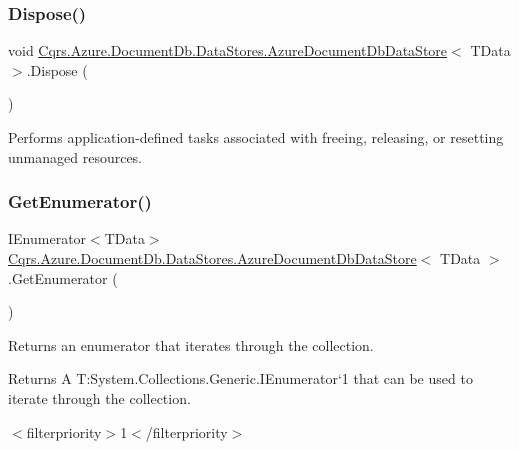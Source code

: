 \subsubsection{\texorpdfstring{Dispose()}{Dispose()}}
{\footnotesize\ttfamily void \hyperlink{classCqrs_1_1Azure_1_1DocumentDb_1_1DataStores_1_1AzureDocumentDbDataStore}{Cqrs.\+Azure.\+Document\+Db.\+Data\+Stores.\+Azure\+Document\+Db\+Data\+Store}$<$ T\+Data $>$.Dispose (\begin{DoxyParamCaption}{ }\end{DoxyParamCaption})}



Performs application-\/defined tasks associated with freeing, releasing, or resetting unmanaged resources. 

\mbox{\label{classCqrs_1_1Azure_1_1DocumentDb_1_1DataStores_1_1AzureDocumentDbDataStore_af83791e306b51fd3ee0b710232e83756_af83791e306b51fd3ee0b710232e83756}} 
\subsubsection{\texorpdfstring{Get\+Enumerator()}{GetEnumerator()}}
{\footnotesize\ttfamily I\+Enumerator$<$T\+Data$>$ \hyperlink{classCqrs_1_1Azure_1_1DocumentDb_1_1DataStores_1_1AzureDocumentDbDataStore}{Cqrs.\+Azure.\+Document\+Db.\+Data\+Stores.\+Azure\+Document\+Db\+Data\+Store}$<$ T\+Data $>$.Get\+Enumerator (\begin{DoxyParamCaption}{ }\end{DoxyParamCaption})}



Returns an enumerator that iterates through the collection. 

\begin{DoxyReturn}{Returns}
A T\+:\+System.\+Collections.\+Generic.\+I\+Enumerator`1 that can be used to iterate through the collection. 
\end{DoxyReturn}
$<$filterpriority$>$1$<$/filterpriority$>$ \mbox{\label{classCqrs_1_1Azure_1_1DocumentDb_1_1DataStores_1_1AzureDocumentDbDataStore_abf9bcf75e8e0e1ec86155bf4da1a7b7a_abf9bcf75e8e0e1ec86155bf4da1a7b7a}} 
